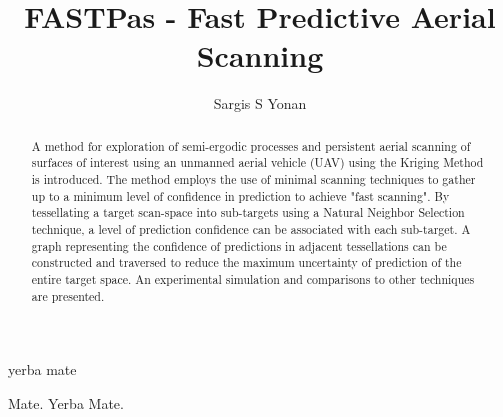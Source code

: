 \documentclass[11pt]{ucthesis}
\begin{document}

\title{FASTPas - Fast Predictive Aerial Scanning}
\author{Sargis S Yonan}
\deanlinethree{}

\begin{frontmatter}

\maketitle
\copyrightpage

\tableofcontents
\listoffigures
\listoftables

\begin{abstract}
A method for exploration of semi-ergodic processes and persistent aerial scanning of surfaces of interest using an unmanned aerial vehicle (UAV) using the Kriging Method is introduced. The method employs the use of minimal scanning techniques to gather up to a minimum level of confidence in prediction to achieve "fast scanning". By tessellating a target scan-space into sub-targets using a Natural Neighbor Selection technique, a level of prediction confidence can be associated with each sub-target. A graph representing the confidence of predictions in adjacent tessellations can be constructed and traversed to reduce the maximum uncertainty of prediction of the entire target space. An experimental simulation and comparisons to other techniques are presented.
\end{abstract}

\begin{dedication}
\null\vfil
{\large
\begin{center}
yerba mate
\vspace{12pt}
\end{center}}
\vfil\null
\end{dedication}


\begin{acknowledgements}
Mate. Yerba Mate.
\end{acknowledgements}

\end{frontmatter}
\end{document}
